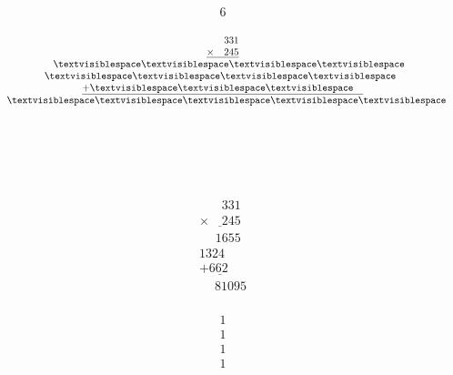 \begin{minipage}[t]{0.05\linewidth}
\begin{align*}\begin{array}{c}
6
\end{array}\end{align*}
\end{minipage}

\begin{minipage}[t]{0.3\linewidth}
\begin{align*}\begin{array}{c}
\phantom{
\times00
}
331\\
\underline{
\times
\phantom{
00
}
245
}\\
\phantom{
+0
}
\textvisiblespace
\textvisiblespace
\textvisiblespace
\textvisiblespace
\\
\textvisiblespace
\textvisiblespace
\textvisiblespace
\textvisiblespace
\phantom0\\
\underline{
+
\textvisiblespace
\textvisiblespace
\textvisiblespace
\phantom0\phantom0
}
\\
\phantom{+}
\textvisiblespace
\textvisiblespace
\textvisiblespace
\textvisiblespace
\textvisiblespace
\end{array}\end{align*}
\end{minipage}
\begin{minipage}[t]{0.05\linewidth}
\begin{align*}\begin{array}{c}
\textvisiblespace
\\
\textvisiblespace
\\
\textvisiblespace
\\
\textvisiblespace
\end{array}\end{align*}
\end{minipage}
\begin{minipage}[t]{0.3\linewidth}
\begin{align*}\begin{array}{c}
\phantom{
\times00
}
331\\
\underline{
\times
\phantom{
00
}
245
}\\
\phantom{
+0
}
1655
\\
1324
\phantom0\\
\underline{
+
662
\phantom0\phantom0
}
\\
\phantom{+}
81095
\end{array}\end{align*}
\end{minipage}
\begin{minipage}[t]{0.05\linewidth}
\begin{align*}\begin{array}{c}
1
\\
1
\\
1
\\
1
\end{array}\end{align*}
\end{minipage}

